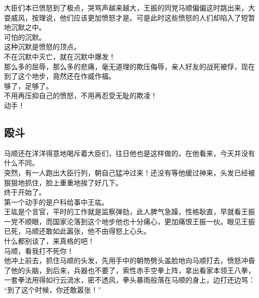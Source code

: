 \begin{multicols}{\theparacolNo}
大臣们本已愤怒到了极点，哭骂声越来越大，王振的同党马顺偏偏这时跳出来，大耍威风，按理说，他们应该更加愤怒才是。可是此时这些愤怒的人们却陷入了短暂地沉默之中。\\

可怕的沉默。\\

这种沉默是愤怒的顶点。\\

不在沉默中灭亡，就在沉默中爆发！\\

那么多的屈辱，那么多的悲痛，毫无道理的欺压侮辱，亲人好友的战死被俘，现在到了这个地步，竟然还在作威作福。\\

够了，足够了。\\

不用再压抑自己的愤怒，不用再忍受无耻的欺凌！\\

动手！\\

\subsection{殴斗}
马顺还在洋洋得意地喝斥着大臣们，往日他也是这样做的，在他看来，今天并没有什么不同。\\

突然，有一人跑出大臣行列，朝自己猛冲过来！还没有等他缓过神来，头发已经被狠狠地抓住，脸上重重地挨了好几下。\\

终于开始了。\\

第一个动手的是户科给事中王竑。\\

王竑是个言官，平时的工作就是监察弹劾，此人脾气急躁，性格耿直，早就看王振一党不顺眼，而国家沦落到这个地步他也十分痛心，更加痛恨王振一伙。眼见王振已死，马顺还敢如此嚣张，他不由得怒上心头。\\

什么都别谈了，来真格的吧！\\

马顺，看我打不死你！\\

他冲上前去，抓住马顺的头发，先用手中的朝笏劈头盖脸地向马顺打去，愤怒冲昏了他的头脑，到后来，兵器也不要了，索性赤手空拳上阵，拿出看家本领王八拳，一套拳法用得如行云流水，密不透风，拳头暴雨般落在马顺的身上，边打还边骂：\\

“到了这个时候，你还敢嚣张！”\\


\end{multicols}
